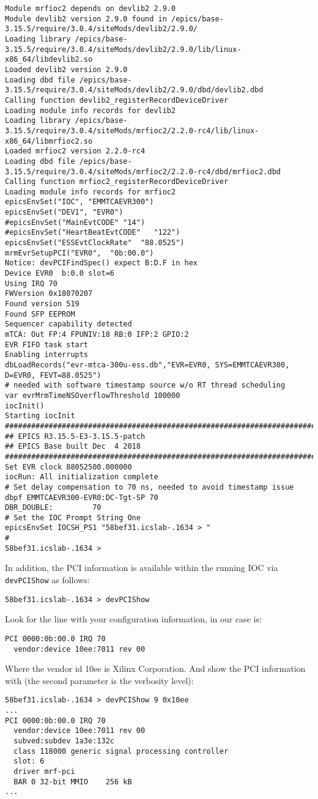 \documentclass[11pt
  , a4paper
  , article
  , oneside
  , showtrims
]{memoir}
\begin{document}
{\begin{lstlisting}[style=termstyle]
Module mrfioc2 depends on devlib2 2.9.0
Module devlib2 version 2.9.0 found in /epics/base-3.15.5/require/3.0.4/siteMods/devlib2/2.9.0/
Loading library /epics/base-3.15.5/require/3.0.4/siteMods/devlib2/2.9.0/lib/linux-x86_64/libdevlib2.so
Loaded devlib2 version 2.9.0
Loading dbd file /epics/base-3.15.5/require/3.0.4/siteMods/devlib2/2.9.0/dbd/devlib2.dbd
Calling function devlib2_registerRecordDeviceDriver
Loading module info records for devlib2
Loading library /epics/base-3.15.5/require/3.0.4/siteMods/mrfioc2/2.2.0-rc4/lib/linux-x86_64/libmrfioc2.so
Loaded mrfioc2 version 2.2.0-rc4
Loading dbd file /epics/base-3.15.5/require/3.0.4/siteMods/mrfioc2/2.2.0-rc4/dbd/mrfioc2.dbd
Calling function mrfioc2_registerRecordDeviceDriver
Loading module info records for mrfioc2
epicsEnvSet("IOC", "EMMTCAEVR300")
epicsEnvSet("DEV1", "EVR0")
#epicsEnvSet("MainEvtCODE" "14")
#epicsEnvSet("HeartBeatEvtCODE"   "122")
epicsEnvSet("ESSEvtClockRate"  "88.0525")
mrmEvrSetupPCI("EVR0",  "0b:00.0")
Notice: devPCIFindSpec() expect B:D.F in hex
Device EVR0  b:0.0 slot=6
Using IRQ 70
FWVersion 0x18070207
Found version 519
Found SFP EEPROM
Sequencer capability detected
mTCA: Out FP:4 FPUNIV:18 RB:0 IFP:2 GPIO:2
EVR FIFO task start
Enabling interrupts
dbLoadRecords("evr-mtca-300u-ess.db","EVR=EVR0, SYS=EMMTCAEVR300, D=EVR0, FEVT=88.0525")
# needed with software timestamp source w/o RT thread scheduling
var evrMrmTimeNSOverflowThreshold 100000
iocInit()
Starting iocInit
############################################################################
## EPICS R3.15.5-E3-3.15.5-patch
## EPICS Base built Dec  4 2018
############################################################################
Set EVR clock 88052500.000000
iocRun: All initialization complete
# Set delay compensation to 70 ns, needed to avoid timestamp issue
dbpf EMMTCAEVR300-EVR0:DC-Tgt-SP 70
DBR_DOUBLE:         70
# Set the IOC Prompt String One
epicsEnvSet IOCSH_PS1 "58bef31.icslab-.1634 > "
#
58bef31.icslab-.1634 >
\end{lstlisting}

In addition, the PCI information is available within the running IOC via \texttt{devPCIShow} as follows:
\begin{lstlisting}
58bef31.icslab-.1634 > devPCIShow
\end{lstlisting}
Look for the line with your configuration information, in our case is:
\begin{lstlisting}
PCI 0000:0b:00.0 IRQ 70
  vendor:device 10ee:7011 rev 00
\end{lstlisting}
Where the vendor id 10ee is Xilinx Corporation.
And show the PCI information with (the second parameter is the verbosity level):
\begin{lstlisting}
58bef31.icslab-.1634 > devPCIShow 9 0x10ee
...
PCI 0000:0b:00.0 IRQ 70
  vendor:device 10ee:7011 rev 00
  subved:subdev 1a3e:132c
  class 118000 generic signal processing controller
  slot: 6
  driver mrf-pci
  BAR 0 32-bit MMIO    256 kB
...
\end{lstlisting}

}
\end{document}
